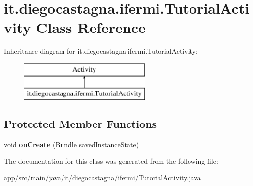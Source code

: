 \hypertarget{classit_1_1diegocastagna_1_1ifermi_1_1_tutorial_activity}{}\section{it.\+diegocastagna.\+ifermi.\+Tutorial\+Activity Class Reference}
\label{classit_1_1diegocastagna_1_1ifermi_1_1_tutorial_activity}
Inheritance diagram for it.\+diegocastagna.\+ifermi.\+Tutorial\+Activity\+:\begin{figure}[H]
\begin{center}
\leavevmode
\includegraphics[height=2.000000cm]{classit_1_1diegocastagna_1_1ifermi_1_1_tutorial_activity}
\end{center}
\end{figure}
\subsection*{Protected Member Functions}
\begin{DoxyCompactItemize}
\item 
\mbox{\label{classit_1_1diegocastagna_1_1ifermi_1_1_tutorial_activity_a0e844d3a5a537bbbec7234f0f71f9620}} 
void {\bfseries on\+Create} (Bundle saved\+Instance\+State)
\end{DoxyCompactItemize}


The documentation for this class was generated from the following file\+:\begin{DoxyCompactItemize}
\item 
app/src/main/java/it/diegocastagna/ifermi/Tutorial\+Activity.\+java\end{DoxyCompactItemize}
